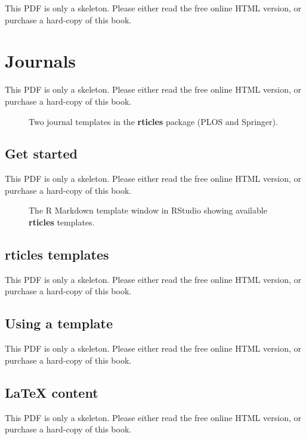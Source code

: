 \documentclass[
  11pt,
]{krantz}
\theoremstyle{definition}
\theoremstyle{definition}
\theoremstyle{definition}
\theoremstyle{definition}
\theoremstyle{remark}
\begin{document}
This PDF is only a skeleton. Please either read the free online HTML version, or purchase a hard-copy of this book.

\chapter{Journals}\label{journals}

This PDF is only a skeleton. Please either read the free online HTML version, or purchase a hard-copy of this book.

\begin{figure}\caption{Two journal templates in the \textbf{rticles} package (PLOS and Springer).}\end{figure}

\section{Get started}\label{rticles-start}

This PDF is only a skeleton. Please either read the free online HTML version, or purchase a hard-copy of this book.

\begin{figure}\caption{The R Markdown template window in RStudio showing available \textbf{rticles} templates.}\end{figure}

\section{rticles templates}\label{rticles-templates}

This PDF is only a skeleton. Please either read the free online HTML version, or purchase a hard-copy of this book.

\section{Using a template}\label{rticles-usage}

This PDF is only a skeleton. Please either read the free online HTML version, or purchase a hard-copy of this book.

\section{LaTeX content}\label{rticles-latex}

This PDF is only a skeleton. Please either read the free online HTML version, or purchase a hard-copy of this book.
\end{document}
